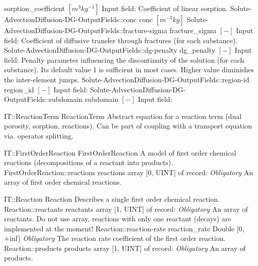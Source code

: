 \begin{SelectionType}
			{sorption{\_}coefficient}
			{{{}{$[m^{3}kg^{-1}]$}{ Input field: Coefficient of linear sorption.}%
}}
		\SelectionItem
			{Solute-AdvectionDiffusion-DG-OutputFields::conc}
			{conc}
			{{{}{$[m^{-3}kg]$}{ }%
}}
		\SelectionItem
			{Solute-AdvectionDiffusion-DG-OutputFields::fracture-sigma}
			{fracture{\_}sigma}
			{{{}{$[-]$}{ Input field: Coefficient of diffusive transfer through fractures (for each substance).}%
}}
		\SelectionItem
			{Solute-AdvectionDiffusion-DG-OutputFields::dg-penalty}
			{dg{\_}penalty}
			{{{}{$[-]$}{ Input field: Penalty parameter influencing the discontinuity of the solution (for each substance). Its default value 1 is sufficient in most cases.
Higher value diminishes the inter-element jumps.}%
}}
		\SelectionItem
			{Solute-AdvectionDiffusion-DG-OutputFields::region-id}
			{region{\_}id}
			{{{}{$[-]$}{ Input field: }%
}}
		\SelectionItem
			{Solute-AdvectionDiffusion-DG-OutputFields::subdomain}
			{subdomain}
			{{{}{$[-]$}{ Input field: }%
}}
\end{SelectionType}
\begin{AbstractType}
	{IT::ReactionTerm}
	{ReactionTerm}
	{}
	{{{Abstract equation for a reaction term (dual porosity, sorption, reactions). Can be part of coupling with a transport equation via. operator splitting.}%
}}
\end{AbstractType}
\begin{RecordType}
	{IT::FirstOrderReaction}
	{FirstOrderReaction}
	{}%
	{}%
	{{{A model of first order chemical reactions (decompositions of a reactant into products).}%
}}
		\RecKey
			{FirstOrderReaction::reactions}
			{reactions}
			{{array [0, UINT] of }{record: }}{}
			{ \it{Obligatory}}
			{{{An array of first order chemical reactions.}%
}}
\end{RecordType}
\begin{RecordType}
	{IT::Reaction}
	{Reaction}
	{}%
	{}%
	{{{Describes a single first order chemical reaction.}%
}}
		\RecKey
			{Reaction::reactants}
			{reactants}
			{{array [1, UINT] of }{record: }}{}
			{ \it{Obligatory}}
			{{{An array of reactants.
Do not use array, reactions with only one reactant (decays) are implemented at the moment!}%
}}
		\RecKey
			{Reaction::reaction-rate}
			{reaction{\_}rate}
			{{Double [0, +inf)}}{}
			{ \it{Obligatory}}
			{{{The reaction rate coefficient of the first order reaction.}%
}}
		\RecKey
			{Reaction::products}
			{products}
			{{array [1, UINT] of }{record: }}{}
			{ \it{Obligatory}}
			{{{An array of products.}%
}}
\end{RecordType}
